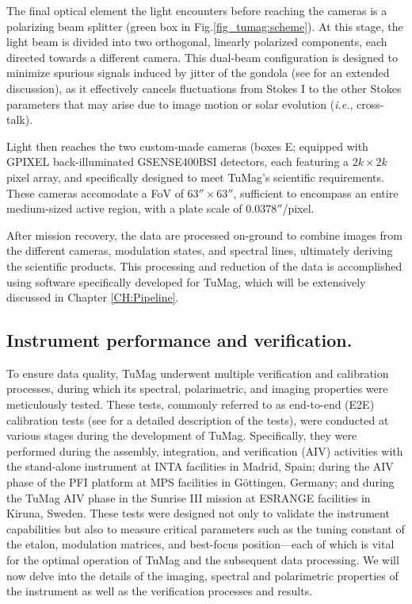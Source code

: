 The final optical element the light encounters before reaching the cameras is a polarizing beam splitter (green box in Fig.\ref{fig_tumag:scheme}). At this stage, the light beam is divided into two orthogonal, linearly polarized components, each directed towards a different camera. This dual-beam configuration \citep{lites-doublebeam} is designed to minimize spurious signals induced by jitter of the gondola (see \citealt{libro_JoseCarlos} for an extended discussion), as it effectively cancels fluctuations from Stokes I to the other Stokes parameters that may arise due to image motion or solar evolution (\textit{i.e.}, cross-talk).

Light then reaches the two custom-made cameras (boxes E; \citealt{tumag-cams} equipped with GPIXEL back-illuminated GSENSE400BSI detectors, each featuring a $2k \times 2k$ pixel array, and specifically designed to meet TuMag's scientific requirements. These cameras accomodate a FoV of $63'' \times 63''$, sufficient to encompass an entire medium-sized active region, with a plate scale of $0.0378''$/pixel.

After mission recovery, the data are processed on-ground to combine images from the different cameras, modulation states, and spectral lines, ultimately deriving the scientific products. This processing and reduction of the data is accomplished using software specifically developed for TuMag, which will be extensively discussed in Chapter \ref{CH:Pipeline}. 

\subsection{Instrument performance and verification.}

To ensure data quality, TuMag underwent multiple verification and calibration processes, during which its spectral, polarimetric, and imaging properties were meticulously tested. These tests, commonly referred to as end-to-end (E2E) calibration tests (see \cite{e2e-tests-inta} for a detailed description of the tests), were conducted at various stages during the development of TuMag. Specifically, they were performed during the assembly, integration, and verification (AIV) activities with the stand-alone instrument at INTA facilities in Madrid, Spain; during the AIV phase of the PFI platform at MPS facilities in Göttingen, Germany; and during the TuMag AIV phase in the Sunrise III mission at ESRANGE facilities in Kiruna, Sweden. These tests were designed not only to validate the instrument capabilities but also to measure critical parameters such as the tuning constant of the etalon, modulation matrices, and best-focus position—each of which is vital for the optimal operation of TuMag and the subsequent data processing. We will now delve into the details of the imaging, spectral and polarimetric properties of the instrument as well as the verification processes and results.

